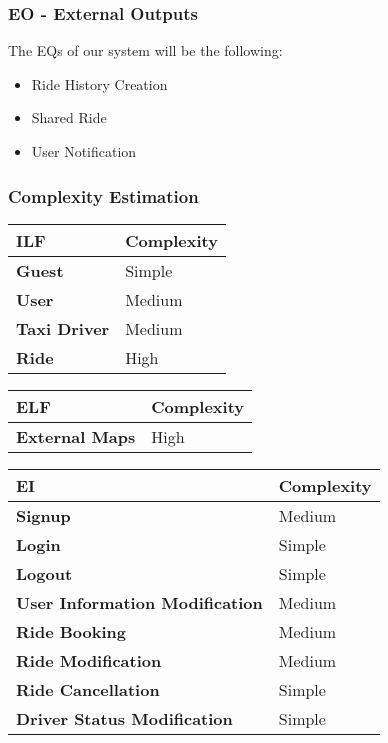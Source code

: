 	\subsubsection{EO - External Outputs}
		The EQs of our system will be the following:
		\begin{itemize}
			\item Ride History Creation
			\item Shared Ride
			\item User Notification
		\end{itemize}
		
	\subsubsection{Complexity Estimation}
		\begin{tabular}{|p{4cm}|p{9cm}|}
			\hline
			\textbf{ILF} & \textbf{Complexity}\\
			\hline
			\textbf{Guest} & Simple \\
			\hline
			\textbf{User} & Medium \\
			\hline
			\textbf{Taxi Driver} & Medium \\
			\hline
			\textbf{Ride} & High \\
			\hline
		\end{tabular}
		
		\vspace{2em}

		\noindent\begin{tabular}{|p{4cm}|p{9cm}|}
			\hline
			\textbf{ELF} & \textbf{Complexity}\\
			\hline
			\textbf{External Maps} & High \\
			\hline
		\end{tabular}
		
		\vspace{2em}
		
		\noindent\begin{tabular}{|p{4cm}|p{9cm}|}
			\hline
			\textbf{EI} & \textbf{Complexity}\\
			\hline
			\textbf{Signup} & Medium \\
			\hline
			\textbf{Login} & Simple \\
			\hline
			\textbf{Logout} & Simple \\
			\hline
			\textbf{User Information Modification} & Medium \\
			\hline
			\textbf{Ride Booking} & Medium \\
			\hline
			\textbf{Ride Modification} & Medium \\
			\hline
			\textbf{Ride Cancellation} & Simple \\
			\hline
			\textbf{Driver Status Modification} & Simple \\
			\hline
		\end{tabular}
		
